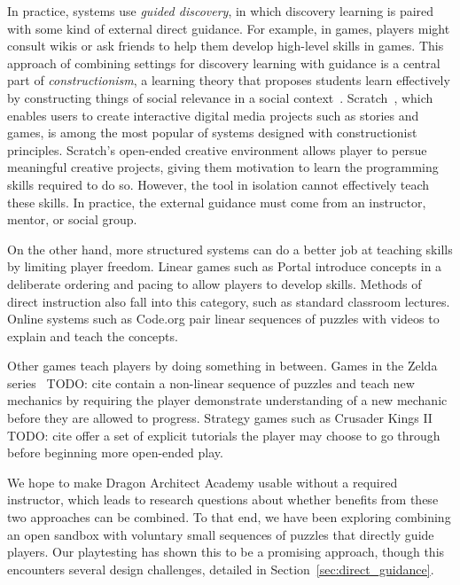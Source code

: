 \documentclass{sig-alternate}
\newcommand{\TODO}[1]{{\color{red} TODO: #1}}
\newcommand{\gametitle}{{\color{RoyalPurple} Dragon Architect Academy}}
\begin{document}
In practice, systems use \emph{guided discovery}, in which discovery learning is paired with some kind of external direct guidance.  For example, in games, players might consult wikis or ask friends to help them develop high-level skills in games.
This approach of combining settings for discovery learning with guidance is a central part of \emph{constructionism}, a learning theory that proposes students learn effectively by constructing things of social relevance in a social context~\cite{kafai06constructionism}.
Scratch~\cite{maloney2010scratch}, which enables users to create interactive digital media projects such as stories and games, is among the most popular of systems designed with constructionist principles.
Scratch's open-ended creative environment allows player to persue meaningful creative projects, giving them motivation to learn the programming skills required to do so.
However, the tool in isolation cannot effectively teach these skills.
In practice, the external guidance must come from an instructor, mentor, or social group.

On the other hand, more structured systems can do a better job at teaching skills by limiting player freedom.
Linear games such as Portal introduce concepts in a deliberate ordering and pacing to allow players to develop skills.
Methods of direct instruction also fall into this category, such as standard classroom lectures.
Online systems such as Code.org pair linear sequences of puzzles with videos to explain and teach the concepts.

Other games teach players by doing something in between. 
Games in the Zelda series~\TODO{cite} contain a non-linear sequence of puzzles and teach new mechanics by requiring the player demonstrate understanding of a new mechanic before they are allowed to progress. 
Strategy games such as Crusader Kings II~\TODO{cite} offer a set of explicit tutorials the player may choose to go through before beginning more open-ended play.

We hope to make \gametitle{} usable without a required instructor, which leads to research questions about whether benefits from these two approaches can be combined.
To that end, we have been exploring combining an open sandbox with voluntary small sequences of puzzles that directly guide players.
Our playtesting has shown this to be a promising approach, though this encounters several design challenges, detailed in Section~\ref{sec:direct_guidance}.
\end{document}
